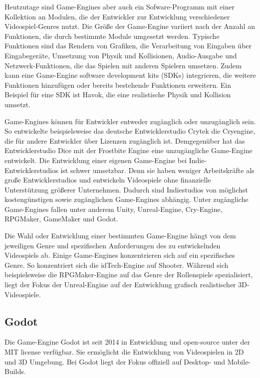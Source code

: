 Heutzutage sind Game-Engines aber auch ein Sofware-Programm mit einer Kollektion an Modulen, die der Entwickler zur Entwicklung verschiedener Videospiel-Genres nutzt. Die Gr\"{o}\ss{}e der Game-Engine variiert nach der Anzahl an Funktionen, die durch bestimmte Module umgesetzt werden. Typische Funktionen sind das Rendern von Grafiken, die Verarbeitung von Eingaben \"{u}ber Eingabeger\"{a}te, Umsetzung von Physik und Kollisionen, Audio-Ausgabe und Netzwerk-Funktionen, die das Spielen mit anderen Spielern umsetzen. Zudem kann eine Game-Engine software development kits (SDKs) integrieren, die weitere Funktionen hinzuf\"{u}gen oder bereits bestehende Funktionen erweitern. Ein Beispiel f\"{u}r eine SDK ist Havok, die eine realistische Physik und Kollision umsetzt.\autocite{gregory2018game}

Game-Engines k\"{o}nnen f\"{u}r Entwickler entweder zug\"{a}nglich oder unzug\"{a}nglich sein. So entwickelte beispielsweise das deutsche Entwicklerstudio Crytek die Cryengine, die f\"{u}r andere Entwickler \"{u}ber Lizenzen zug\"{a}nglich ist. Demgegen\"{u}ber hat das Entwicklerstudio Dice mit der Frostbite Engine eine unzug\"{a}ngliche Game-Engine entwickelt. Die Entwicklung einer eigenen Game-Engine bei Indie-Entwicklerstudios ist schwer umsetzbar. Denn sie haben weniger Arbeitskr\"{a}fte als gro\ss{}e Entwicklerstudios und entwickeln Videospiele ohne finanzielle Unterst\"{u}tzung gr\"{o}\ss{}erer Unternehmen. Dadurch sind Indiestudios von m\"{o}glichst kosteng\"{u}nstigen sowie zug\"{a}nglichen Game-Engines abh\"{a}ngig. Unter zug\"{a}ngliche Game-Engines fallen unter anderem Unity, Unreal-Engine, Cry-Engine, RPGMaker, GameMaker und Godot.

Die Wahl oder Entwicklung einer bestimmten Game-Engine h\"{a}ngt von dem jeweiligen Genre und spezifischen Anforderungen des zu entwickelnden Videospiels ab. Einige Game-Engines konzentrieren sich auf ein spezifisches Genre. So konzentriert sich die idTech-Engine auf Shooter. W\"{a}hrend sich beispielsweise die RPGMaker-Engine auf das Genre der Rollenspiele spezialisiert, liegt der Fokus der Unreal-Engine auf der Entwicklung grafisch realistischer 3D-Videospiele.


\subsection{Godot}
\label{chap:godot}
Die Game-Engine Godot ist seit 2014 in Entwicklung und open-source unter der MIT license verf\"{u}gbar. Sie erm\"{o}glicht die Entwicklung von Videospielen in 2D und 3D Umgebung. Bei Godot liegt der Fokus offiziell auf Desktop- und Mobile-Builds. \autocite{godotgit}

